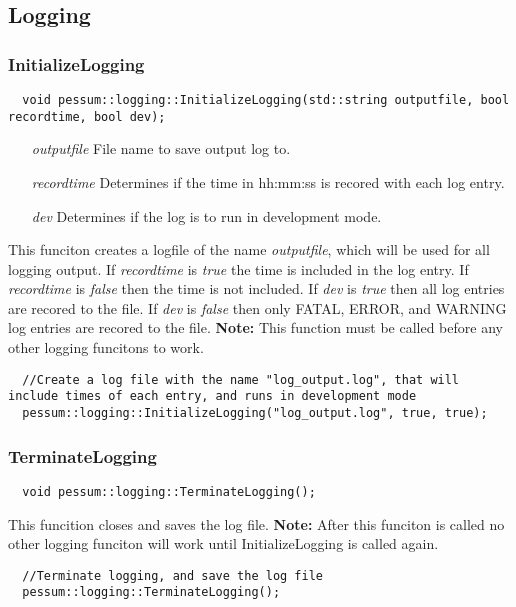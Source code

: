 \documentclass{subfiles}
\begin{document}
\subsection{Logging}
\newpage
\subsubsection{InitializeLogging}
\begin{lstlisting}
  void pessum::logging::InitializeLogging(std::string outputfile, bool recordtime, bool dev);
\end{lstlisting}
\begin{enumerate}
	\item[\emph{outputfile}] File name to save output log to.
	\item[\emph{recordtime}] Determines if the time in hh:mm:ss is recored with each log entry.
	\item[\emph{dev}] Determines if the log is to run in development mode.
\end{enumerate}
This funciton creates a logfile of the name \emph{outputfile}, which will be used for all logging output. If \emph{recordtime} is \emph{true} the time is included in the log entry. If \emph{recordtime} is \emph{false} then the time is not included. If \emph{dev} is \emph{true} then all log entries are recored to the file. If \emph{dev} is \emph{false} then only FATAL, ERROR, and WARNING log entries are recored to the file. \textbf{Note:} This function must be called before any other logging funcitons to work.
\begin{lstlisting}
  //Create a log file with the name "log_output.log", that will include times of each entry, and runs in development mode
  pessum::logging::InitializeLogging("log_output.log", true, true);
\end{lstlisting}
\newpage
\subsubsection{TerminateLogging}
\begin{lstlisting}
  void pessum::logging::TerminateLogging();
\end{lstlisting}
This funcition closes and saves the log file. \textbf{Note:} After this funciton is called no other logging funciton will work until InitializeLogging is called again.
\begin{lstlisting}
  //Terminate logging, and save the log file
  pessum::logging::TerminateLogging();
\end{lstlisting}
\newpage
\end{document}
